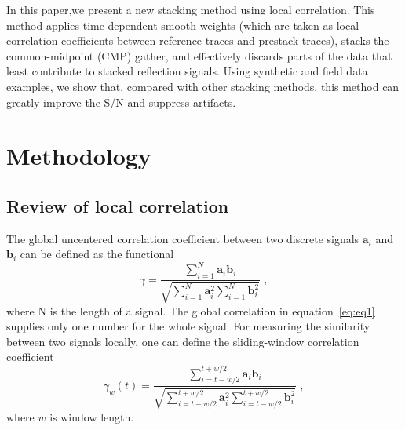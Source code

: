 In this paper,we present a new stacking method using local correlation.
This method applies time-dependent smooth weights (which
are taken as local correlation coefficients between reference traces
and prestack traces), stacks the common-midpoint (CMP) gather,
and effectively discards parts of the data that least contribute to
stacked reflection signals. Using synthetic and field data examples,
we show that, compared with other stacking methods, this method
can greatly improve the S/N and suppress artifacts.

\section{Methodology}

 \subsection{Review of local correlation}

The global uncentered correlation coefficient between two discrete
signals $\mathbf{a}_i$ and $\mathbf{b}_i$ can be defined as the functional
      \begin{equation}
          \gamma = \frac{\displaystyle\sum_{i=1}^{N}\mathbf{a}_i \mathbf{b}_i}{\sqrt{\displaystyle\sum_{i=1}^{N}\mathbf{a}^2_i \sum_{i=1}^{N}\mathbf{b}^2_i}}\;,
        \label{eq:eq1}
      \end{equation}
where N is the length of a signal. The global correlation in equation~\ref{eq:eq1}
supplies only one number for the whole signal. For measuring the
similarity between two signals locally, one can define the sliding-window
correlation coefficient
      \begin{equation}
          \gamma_w(t) = \frac{\displaystyle\sum_{i=t-w/2}^{t+w/2} \mathbf{a}_i \mathbf{b}_i}{\sqrt{\displaystyle\sum_{i=t-w/2}^{t+w/2} \mathbf{a}_i^2 \displaystyle\sum_{i=t-w/2}^{t+w/2} \mathbf{b}_i^2 }}\;,
        \label{eq:eq2}
      \end{equation}
where $w$ is window length.

